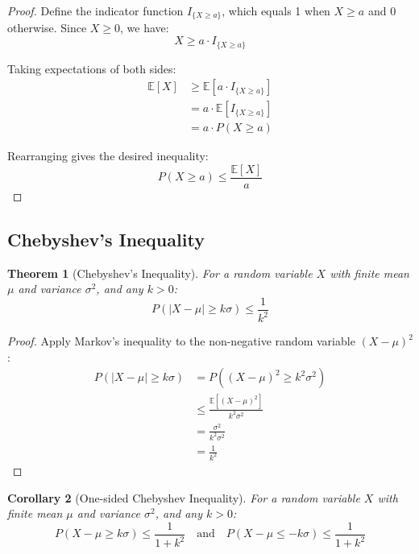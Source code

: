 \documentclass[12pt,a4paper]{article}
\theoremstyle{plain}
\newtheorem{theorem}{Theorem}[section]
\newtheorem{corollary}[theorem]{Corollary}
\theoremstyle{definition}
\begin{document}
\begin{proof}
Define the indicator function $I_{\{X \geq a\}}$, which equals 1 when $X \geq a$ and 0 otherwise. Since $X \geq 0$, we have:
\begin{equation*}
X \geq a \cdot I_{\{X \geq a\}}
\end{equation*}

Taking expectations of both sides:
\begin{align*}
\mathbb{E}[X] &\geq \mathbb{E}[a \cdot I_{\{X \geq a\}}]\\
&= a \cdot \mathbb{E}[I_{\{X \geq a\}}]\\
&= a \cdot P(X \geq a)
\end{align*}

Rearranging gives the desired inequality:
\begin{equation*}
P(X \geq a) \leq \frac{\mathbb{E}[X]}{a}
\end{equation*}
\end{proof}

\subsection{Chebyshev's Inequality}

\begin{theorem}[Chebyshev's Inequality]
For a random variable $X$ with finite mean $\mu$ and variance $\sigma^2$, and any $k > 0$:
\begin{equation}
P(|X - \mu| \geq k\sigma) \leq \frac{1}{k^2}
\end{equation}
\end{theorem}

\begin{proof}
Apply Markov's inequality to the non-negative random variable $(X - \mu)^2$:
\begin{align*}
P(|X - \mu| \geq k\sigma) &= P((X - \mu)^2 \geq k^2\sigma^2)\\
&\leq \frac{\mathbb{E}[(X - \mu)^2]}{k^2\sigma^2}\\
&= \frac{\sigma^2}{k^2\sigma^2}\\
&= \frac{1}{k^2}
\end{align*}
\end{proof}

\begin{corollary}[One-sided Chebyshev Inequality]
For a random variable $X$ with finite mean $\mu$ and variance $\sigma^2$, and any $k > 0$:
\begin{equation}
P(X - \mu \geq k\sigma) \leq \frac{1}{1 + k^2} \quad \text{and} \quad P(X - \mu \leq -k\sigma) \leq \frac{1}{1 + k^2}
\end{equation}
\end{corollary}
\end{document}
